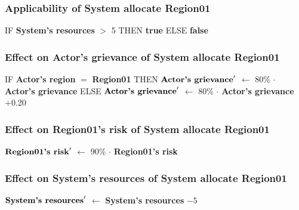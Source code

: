 \documentclass{article}%
\begin{document}
%
\subsubsection{Applicability of System allocate Region01}%
\label{ssubsec:Applicability of System allocate Region01}%
\begin{flushleft}%
IF %
\textbf{System's resources}%
$>$%
5%
\linebreak%
\hspace*{2em}%
THEN %
\textbf{true}%
\linebreak%
\hspace*{2em}%
ELSE %
\textbf{false}%
\end{flushleft}

%
\subsubsection{Effect on Actor's grievance of System allocate Region01}%
\label{ssubsec:Effect on Actor's grievance of System allocate Region01}%
\begin{flushleft}%
IF %
\textbf{Actor's region}%
$=$%
\textbf{Region01}%
\linebreak%
\hspace*{2em}%
THEN %
$\mbox{\textbf{Actor's grievance}} '$%
$\leftarrow$%
80\%%
$\cdot$%
\textbf{Actor's grievance}%
\linebreak%
\hspace*{2em}%
ELSE %
$\mbox{\textbf{Actor's grievance}} '$%
$\leftarrow$%
80\%%
$\cdot$%
\textbf{Actor's grievance}%
+0.20%
\end{flushleft}

%
\subsubsection{Effect on Region01's risk of System allocate Region01}%
\label{ssubsec:Effect on Region01's risk of System allocate Region01}%
\begin{flushleft}%
$\mbox{\textbf{Region01's risk}} '$%
$\leftarrow$%
90\%%
$\cdot$%
\textbf{Region01's risk}%
\end{flushleft}

%
\subsubsection{Effect on System's resources of System allocate Region01}%
\label{ssubsec:Effect on System's resources of System allocate Region01}%
\begin{flushleft}%
$\mbox{\textbf{System's resources}} '$%
$\leftarrow$%
\textbf{System's resources}%
${-}5$%
\end{flushleft}
\end{document}
